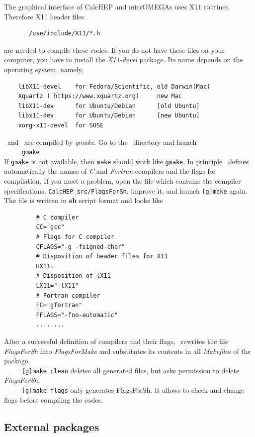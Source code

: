 \documentclass[12pt,a4paper]{article}
\begin{document}
The   graphical interface of CalcHEP and micrOMEGAs uses X11 routines. Therefore X11 header files\\ 
\begin{verbatim}
       /use/include/X11/*.h
\end{verbatim}
are needed to  compile these codes.
If you do not have these files on your computer, you have to install the {\it X11-devel} package. Its name depends on the operating system, namely,
\begin{verbatim}
    libX11-devel    for Fedora/Scientific, old Darwin(Mac)
    Xquartz ( https://www.xquartz.org)     new Mac  
    libX11-dev      for Ubuntu/Debian      [old Ubuntu]
    libx11-dev      for Ubuntu/Debian      [new Ubuntu]
    xorg-x11-devel  for SUSE
\end{verbatim}


   \calchep\ and \micro\ are compiled by {\it gmake}. Go to the \micro\ directory
and launch\\
\verb|     gmake|\\
If {\tt gmake} is not available, then {\tt make} should work like {\tt gmake}.
In principle \micro\ defines automatically the names of {\it C} and {\it
Fortran} compilers and the flags for
compilation. If you meet a  problem, open the file which contains the compiler specifications, 
\verb|CalcHEP_src/FlagsForSh|,
 improve it, and launch {\tt [g]make} 
again. The file  is written in {\bf sh} script format and looks like
\begin{verbatim}
         # C compiler
         CC="gcc"
         # Flags for C compiler
         CFLAGS="-g -fsigned-char"
         # Disposition of header files for X11
         HX11=
         # Disposition of lX11
         LX11="-lX11"
         # Fortran compiler
         FC="gfortran"
         FFLAGS="-fno-automatic"
         ........
\end{verbatim}
After a successful definition of compilers and their flags,   \micro\ rewrites the file 
 {\it FlagsForSh} into {\it FlagsForMake} and substitutes its contents in all {\it
Makefile}s of the package.\\

\noindent
\verb|     [g]make clean|    deletes all generated files, but asks permission to
delete {\it FlagsForSh}.\\
\verb|     [g]make flags|       only generates FlagsForSh. It allows to check and
change  flags before compiling the codes.


\subsection{External packages}
\end{document}
